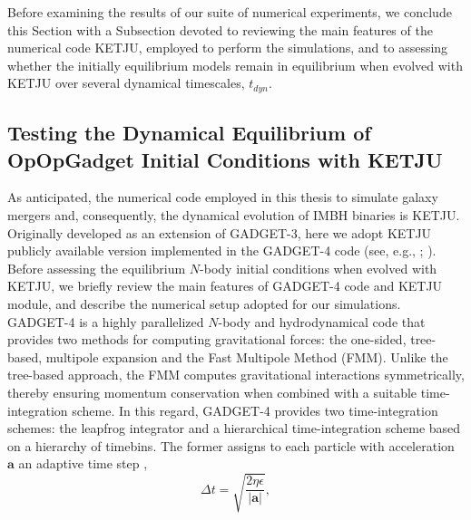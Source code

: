 \documentclass[12pt,twoside,openany]{book}
\begin{document}
Before examining the results of our suite of numerical experiments, we conclude this Section with a Subsection devoted to reviewing the main features of the numerical code KETJU, employed to perform the simulations, and to assessing whether the initially equilibrium models remain in equilibrium when evolved with KETJU over several dynamical timescales, $t_{dyn}$.



















\subsection{Testing the Dynamical Equilibrium of OpOpGadget Initial Conditions with KETJU}
As anticipated, the numerical code employed in this thesis to simulate galaxy mergers and, consequently, the dynamical evolution of IMBH binaries is KETJU. Originally developed as an extension of GADGET-3, here we adopt KETJU publicly available version implemented in the  GADGET-4 code (see, e.g., \citealt{Springel_2021}; \citealt{Mannerkoski_2023}). Before assessing the equilibrium $N$-body initial conditions when evolved with KETJU, we briefly review the main features of GADGET-4 code and KETJU module, and describe the numerical setup adopted for our simulations.\\GADGET-4 is a highly parallelized $N$-body and hydrodynamical code that provides two methods for computing gravitational forces: the one-sided, tree-based, multipole expansion and the Fast Multipole Method (FMM). Unlike the tree-based approach, the FMM computes gravitational interactions symmetrically, thereby ensuring momentum conservation when combined with a suitable time-integration scheme. In this regard, GADGET-4 provides two time-integration schemes: the leapfrog integrator and a hierarchical time-integration scheme based on a hierarchy of timebins. The former assigns to each particle with acceleration $\mathbf{a}$ an adaptive time step \parencite{Springel_2005},
\begin{equation}
\Delta t=\sqrt{\frac{2\eta\epsilon}{|\mathbf{a}|}},
\end{equation}
\end{document}
